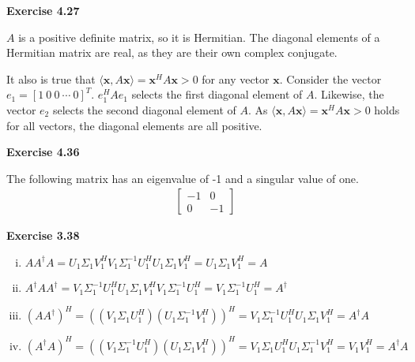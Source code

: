 \documentclass[letterpaper,12pt]{article}
\newcommand{\vect}[1]{\mathbf{#1}}
\begin{document}
\textbf{Exercise 4.27}

$A$ is a positive definite matrix, so it is Hermitian. The diagonal elements of a Hermitian matrix are real, as they are their own complex conjugate.

It also is true that $\langle \vect{x},  A\vect{x} \rangle = \vect{x}^H A \vect{x} > 0$ for any vector $\vect{x}$. Consider the vector $e_1 = [1 \ 0 \ 0 \ \cdots \ 0]^T$. $e_1^H A e_1$ selects the first diagonal element of $A$. Likewise, the vector $e_2$ selects the second diagonal element of $A$. As $\langle \vect{x}, A\vect{x} \rangle = \vect{x}^H A \vect{x} > 0$ holds for all vectors, the diagonal elements are all positive.

\textbf{Exercise 4.36}

The following matrix has an eigenvalue of -1 and a singular value of one.
\begin{align*}
\begin{bmatrix}
-1 & 0 \\
0 & -1
\end{bmatrix}
\end{align*}

\textbf{Exercise 3.38}

\begin{enumerate}[i)]
	\item $AA^{\dagger}A = U_1 \Sigma_1 V_1^H V_1 \Sigma_1^{-1} U_1^H U_1 \Sigma_1 V_1^H = U_1  \Sigma_1 V_1^H = A $
	\item $A^{\dagger} A A^{\dagger} = V_1 \Sigma_1^{-1} U_1^H U_1 \Sigma_1 V_1^H V_1 \Sigma_1^{-1} U_1^H =  V_1 \Sigma_1^{-1} U_1^H = A^{\dagger}$
	\item $(A A^{\dagger})^H = ((V_1 \Sigma_1 U_1^H) (U_1 \Sigma_1^{-1} V_1^H))^H = V_1 \Sigma_1^{-1} U_1^H U_1 \Sigma_1 V_1^H = A^{\dagger} A$
	\item $(A^{\dagger} A)^H = (( V_1 \Sigma_1^{-1} U_1^H)(U_1 \Sigma_1 V_1^H))^H = V_1 \Sigma_1 U_1^H U_1 \Sigma_1^{-1} V_1^H = V_1 V_1^H = A^{\dagger} A$
\end{enumerate}
\end{document}
